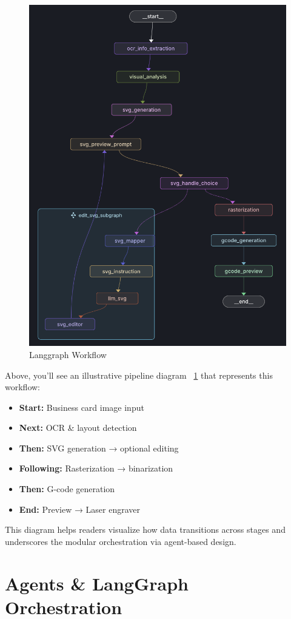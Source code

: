 \begin{figure}
	\begin{center}
		\includegraphics[width=0.6\linewidth]{Images/Langgraph.png}
		\caption{Langgraph Workflow}
		\label{Langgraph} 
	\end{center}
\end{figure}

Above, you’ll see an illustrative pipeline diagram ~\ref{Langgraph} that represents this workflow:


\begin{itemize}
	\item \textbf{Start:} Business card image input
	\item \textbf{Next:} OCR \& layout detection
	\item \textbf{Then:} SVG generation → optional editing
	\item \textbf{Following:} Rasterization → binarization
	\item \textbf{Then:} G-code generation
	\item \textbf{End:} Preview → Laser engraver
	
\end{itemize}
		
	This diagram helps readers visualize how data transitions across stages and underscores the modular orchestration via agent-based design.
	
	
\section{Agents \& LangGraph Orchestration}

